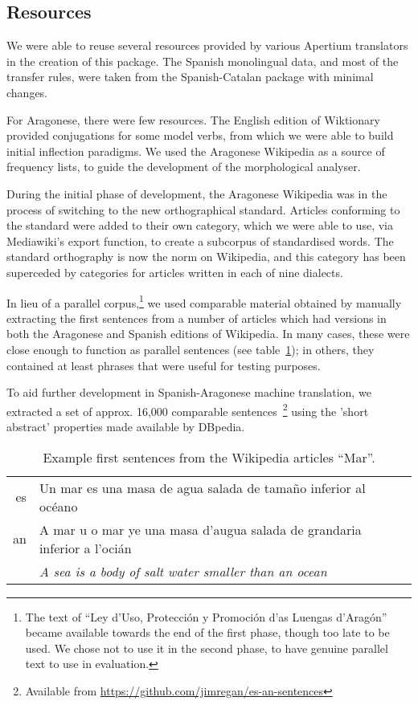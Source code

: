 \documentclass[10pt,a4paper,twocolumn]{article}
\begin{document}
  \subsection{Resources}
  
  We were able to reuse several resources provided by various Apertium translators in the creation of this package. The Spanish monolingual data, and most of the transfer rules, were taken from the Spanish-Catalan package with minimal changes. 
  
  For Aragonese, there were few resources. The English edition of Wiktionary provided conjugations for some model verbs, from which we were able to build initial inflection paradigms. We used the Aragonese Wikipedia as a source of frequency lists, to guide the development of the morphological analyser.
  
  During the initial phase of development, the Aragonese Wikipedia was in the process of switching to the new orthographical standard. Articles conforming to the standard were added to their own category, which we were able to use, via Mediawiki's export function, to create a subcorpus of standardised words. The standard orthography is now the norm on Wikipedia, and this category has been superceded by categories for articles written in each of nine dialects.
  
  In lieu of a parallel corpus,\footnote{The text of ``Ley d'Uso, Protección y Promoción d'as Luengas d'Aragón'' became available towards the end of the first phase, though too late to be used. We chose not to use it in the second phase, to have genuine parallel text to use in evaluation.} we used comparable material obtained by manually extracting the first sentences from a number of articles which had versions in both the Aragonese and Spanish editions of Wikipedia. In many cases, these were close enough to function as parallel sentences (see table~\ref{tab:comp}); in others, they contained at least phrases that were useful for testing purposes.
 
  To aid further development in Spanish-Aragonese machine translation, we extracted a set of approx. 16,000 comparable sentences~\footnote{Available from \url{https://github.com/jimregan/es-an-sentences}} using the 'short abstract' properties made available by DBpedia\cite{DBpedia}.


  \begin{table}
  \begin{center}
  \caption{Example first sentences from the Wikipedia articles ``Mar''.\label{tab:comp}}
  \begin{tabular}{r p{5cm}}
     es & Un mar es una masa de agua salada de tamaño inferior al océano \\
     an & A mar u o mar ye una masa d'augua salada de grandaria inferior a l'ocián \\
        & {\em A sea is a body of salt water smaller than an ocean}\\
  \end{tabular}
  \end{center}
  \end{table}
  
\end{document}
